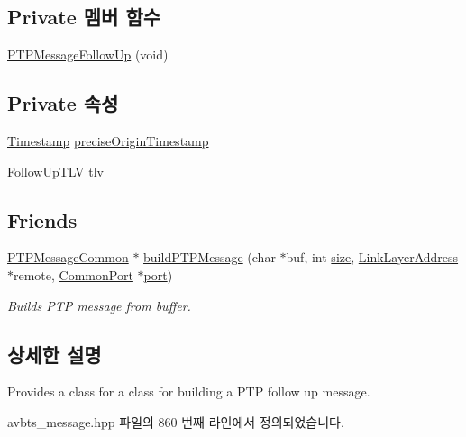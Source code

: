 \subsection*{Private 멤버 함수}
\begin{DoxyCompactItemize}
\item 
\hyperlink{class_p_t_p_message_follow_up_a88f99fa4a1dff66f8c05b8492c23e5cd}{P\+T\+P\+Message\+Follow\+Up} (void)
\end{DoxyCompactItemize}
\subsection*{Private 속성}
\begin{DoxyCompactItemize}
\item 
\hyperlink{class_timestamp}{Timestamp} \hyperlink{class_p_t_p_message_follow_up_ab410646215c0bcbaf124d5923f22e2ca}{precise\+Origin\+Timestamp}
\item 
\hyperlink{class_follow_up_t_l_v}{Follow\+Up\+T\+LV} \hyperlink{class_p_t_p_message_follow_up_adb3aa00a5c7072f30af7374ea54c158c}{tlv}
\end{DoxyCompactItemize}
\subsection*{Friends}
\begin{DoxyCompactItemize}
\item 
\hyperlink{class_p_t_p_message_common}{P\+T\+P\+Message\+Common} $\ast$ \hyperlink{class_p_t_p_message_follow_up_a3f587ce328a50a9f7af19f9822579d0d}{build\+P\+T\+P\+Message} (char $\ast$buf, int \hyperlink{gst__avb__playbin_8c_a439227feff9d7f55384e8780cfc2eb82}{size}, \hyperlink{class_link_layer_address}{Link\+Layer\+Address} $\ast$remote, \hyperlink{class_common_port}{Common\+Port} $\ast$\hyperlink{gst__avb__playbin_8c_a63c89c04d1feae07ca35558055155ffb}{port})
\begin{DoxyCompactList}\small\item\em Builds P\+TP message from buffer. \end{DoxyCompactList}\end{DoxyCompactItemize}


\subsection{상세한 설명}
Provides a class for a class for building a P\+TP follow up message. 

avbts\+\_\+message.\+hpp 파일의 860 번째 라인에서 정의되었습니다.



